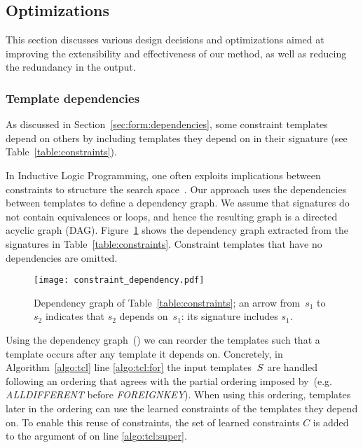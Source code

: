 \subsection{Optimizations} \label{sec:opts}
This section discusses various design decisions and optimizations aimed at improving the extensibility and effectiveness of our method, as well as reducing the redundancy in the output.

\subsubsection{Template dependencies}
As discussed in Section~\ref{sec:form:dependencies}, some constraint templates depend on others by including templates they depend on in their signature (see Table~\ref{table:constraints}).

In Inductive Logic Programming, one often exploits implications between constraints to structure the search space~\parencite{luc_book}.
Our approach uses the dependencies between templates to define a dependency graph.
We assume that signatures do not contain equivalences or loops, and hence the resulting graph is a directed acyclic graph (DAG).
Figure~\ref{fig:learning_order} shows the dependency graph extracted from the signatures in Table~\ref{table:constraints}. 
Constraint templates that have no dependencies are omitted.

\begin{figure}[t]
  \centering
  \texttt{[image: constraint\_dependency.pdf]}
  \caption{Dependency graph of Table~\ref{table:constraints}; an arrow from~$s_1$ to~$s_2$ indicates that $s_2$ depends on~$s_1$: its signature includes $s_1$.
  }
  \label{fig:learning_order}
\end{figure}

Using the dependency graph~(\dependencies) we can reorder the templates such that a template occurs after any template it depends on.
Concretely, in Algorithm~\ref{algo:tcl} line \ref{algo:tcl:for} the input templates~$S$ are handled following an ordering that agrees with the partial ordering imposed by~\dependencies (e.g. \textit{ALLDIFFERENT} before \textit{FOREIGNKEY}).
When using this ordering, templates later in the ordering can use the learned constraints of the templates they depend on.
To enable this reuse of constraints, the set of learned constraints $C$ is added to the argument of \generategroups on line \ref{algo:tcl:super}.

